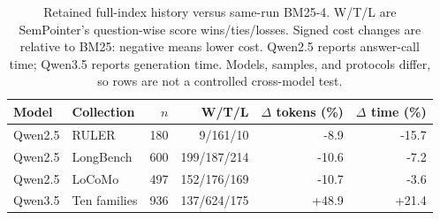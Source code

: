 \begin{table}[htbp]
\centering
\small
\setlength{\tabcolsep}{4pt}
\caption{Retained full-index history versus same-run BM25-4. W/T/L are SemPointer's question-wise score wins/ties/losses. Signed cost changes are relative to BM25: negative means lower cost. Qwen2.5 reports answer-call time; Qwen3.5 reports generation time. Models, samples, and protocols differ, so rows are not a controlled cross-model test.}
\label{tab:history}
\begin{tabular}{llrrrr}
\toprule
Model & Collection & $n$ & W/T/L & $\Delta$ tokens (\%) & $\Delta$ time (\%) \\
\midrule
Qwen2.5 & RULER & 180 & 9/161/10 & -8.9 & -15.7 \\
Qwen2.5 & LongBench & 600 & 199/187/214 & -10.6 & -7.2 \\
Qwen2.5 & LoCoMo & 497 & 152/176/169 & -10.7 & -3.6 \\
Qwen3.5 & Ten families & 936 & 137/624/175 & +48.9 & +21.4 \\
\bottomrule
\end{tabular}
\end{table}
